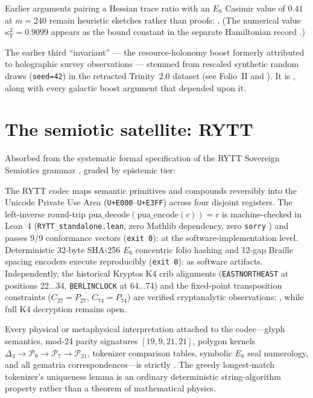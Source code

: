 \documentclass{alienfolio}
\begin{document}
 Earlier arguments pairing
a Hessian trace ratio with an $E_8$ Casimir value of $0.41$ at $m=240$
remain heuristic sketches rather than proofs: .
(The numerical value $\kappa_Y^2 = 0.9099$ appears as the bound constant
in the separate Hamiltonian record \cite{ryh11}.)

 The earlier third ``invariant''
--- the resource-holonomy boost formerly attributed to holographic
survey observations --- stemmed from rescaled synthetic random draws
(\texttt{seed=42}) in the retracted Trinity~2.0 dataset (see Folio~II
\cite{folio-ii} and  \cite{arsmagna}).
It is , along with every galactic boost argument
that depended upon it.

\section{The semiotic satellite: RYTT}

Absorbed from the systematic formal specification of the RYTT Sovereign
Semiotics grammar \cite{rytt-repo}, graded by epistemic tier:

 The RYTT codec maps semantic primitives and
compounds reversibly into the Unicode Private Use Area
(\texttt{U+E000}--\texttt{U+E3FF}) across four disjoint registers. The
left-inverse round-trip $\mathrm{pua\_decode}(\mathrm{pua\_encode}(c)) = c$
is machine-checked in Lean~4 (\texttt{RYTT\_standalone.lean}, zero
Mathlib dependency, zero \texttt{sorry} \cite{rytt-repo}) and passes 9/9
conformance vectors (\texttt{exit 0}):  at the
software-implementation level. Deterministic 32-byte SHA-256 $E_8$
concentric folio hashing and 12-gap Braille spacing encoders execute
reproducibly (\texttt{exit 0}):  as software
artifacts. Independently, the historical Kryptos K4 crib alignments
(\texttt{EASTNORTHEAST} at positions $22\ldots34$, \texttt{BERLINCLOCK}
at $64\ldots74$) and the fixed-point transposition constraints ($C_{27} =
P_{27}$, $C_{74} = P_{74}$) are verified cryptanalytic observations:
, while full K4 decryption remains open.

 Every physical or
metaphysical interpretation attached to the codec---glyph semantics,
mod-24 parity signatures $[19, 9, 21, 21]$, polygon kernels
$\Delta_3 \to \mathcal{P}_9 \to \mathcal{P}_7 \to \mathcal{P}_{21}$,
tokenizer comparison tables, symbolic $E_8$ seal numerology, and all
gematria correspondences---is strictly . The greedy
longest-match tokenizer's uniqueness lemma is an ordinary deterministic
string-algorithm property rather than a theorem of mathematical physics.
\end{document}
